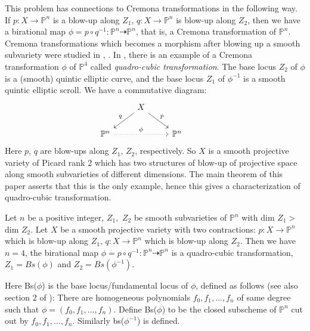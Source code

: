 \documentclass{article}
\newenvironment{manualtheorem}[1]{%
  \renewcommand\themanualtheoreminner{#1}%
  \manualtheoreminner
}{\endmanualtheoreminner}
\begin{document}
 This problem has connections to Cremona transformations in the following way. If $p:X\to \mathbb{P}^n $ is a blow-up along $Z_1$, $q:X\to \mathbb{P}^n $ is blow-up along $Z_2$, then we have a birational map $\phi= p \circ q^{-1}: \mathbb{P}^n \dashrightarrow \mathbb{P}^n$, that is, a Cremona transformation of $\mathbb{P}^n$. Cremona transformations which becomes a morphism after blowing up a smooth subvariety were studied in \cite{crauder1989cremona}, \cite{crauder1991cremona}. In \cite{crauder1989cremona}, there is an example of a Cremona transformation $\phi$ of $\mathbb{P}^4$ called \textit{quadro-cubic transformation}. The base locus $Z_2$ of $\phi$ is a (smooth) quintic elliptic curve, and the base locus $Z_1$ of $\phi^{-1}$ is a smooth quintic elliptic scroll. We have a commutative diagram:
 \begin{equation*}
\begin{tikzcd} 
{}& X \arrow[dl, "q"'] \arrow[dr, "p"] & \\
\mathbb{P}^n \arrow[dotted, rr, "\phi"] &&  \mathbb{P}^n 
  & {}  
\end{tikzcd}
\end{equation*}
Here $p$, $q$ are blow-ups along $Z_1$, $Z_2$, respectively. So $X$ is a smooth projective variety of Picard rank $2$ which has two structures of blow-up of projective space along smooth subvarieties of different dimensions. The main theorem of this paper asserts that this is the only example, hence this gives a characterization of quadro-cubic transformation.
 
\begin{manualtheorem}{A}\label{A}
    
Let $n$ be a positive integer, $Z_1,$ $Z_2$ be smooth subvarieties of $\mathbb{P}^n$ with dim $Z_1>$ dim $Z_2$. Let $X$ be a smooth projective variety with two contractions: $p:X\to \mathbb{P}^n $ which is blow-up along $Z_1$, $q:X\to \mathbb{P}^n $ which is blow-up along $Z_2$. Then we have $n=4$, the birational map $\phi=p \circ q^{-1}: \mathbb{P}^n \dashrightarrow \mathbb{P}^n$ is a quadro-cubic transformation, $Z_1=Bs(\phi)$ and $Z_2=Bs(\phi^{-1})$.
 \end{manualtheorem}

Here Bs($\phi$) is the base locus/fundamental locus of $\phi$, defined as follows (see also section $2$ of \cite{ein1989some}): There are homogeneous polynomials $f_0,f_1,...,f_n$ of same degree such that $\phi=(f_0,f_1,...,f_n)$. Define Bs($\phi$) to be the closed subscheme of $\mathbb{P}^n$ cut out by $f_0,f_1,...,f_n$. Similarly bs($\phi^{-1}$) is defined.
\end{document}
